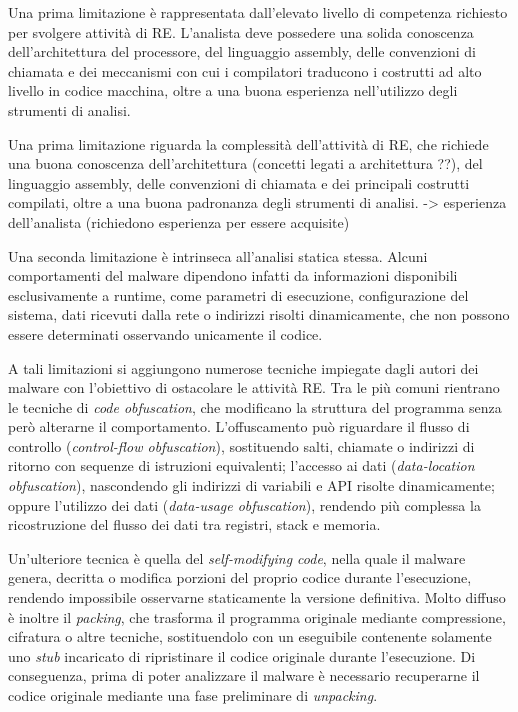 Una prima limitazione è rappresentata dall'elevato livello di competenza richiesto per svolgere attività di RE. L'analista deve possedere una solida conoscenza dell'architettura del processore, del linguaggio assembly, delle convenzioni di chiamata e dei meccanismi con cui i compilatori traducono i costrutti ad alto livello in codice macchina, oltre a una buona esperienza nell'utilizzo degli strumenti di analisi.

Una prima limitazione riguarda la complessità dell'attività di RE, che richiede una buona conoscenza dell'architettura (concetti legati a architettura ??), del linguaggio assembly, delle convenzioni di chiamata e dei principali costrutti compilati, oltre a una buona padronanza degli strumenti di analisi. -> esperienza dell'analista (richiedono esperienza per essere acquisite)

Una seconda limitazione è intrinseca all'analisi statica stessa. Alcuni comportamenti del malware dipendono infatti da informazioni disponibili esclusivamente a runtime, come parametri di esecuzione, configurazione del sistema, dati ricevuti dalla rete o indirizzi risolti dinamicamente, che non possono essere determinati osservando unicamente il codice.

A tali limitazioni si aggiungono numerose tecniche impiegate dagli autori dei malware con l'obiettivo di ostacolare le attività RE. Tra le più comuni rientrano le tecniche di \textit{code obfuscation}, che modificano la struttura del programma senza però alterarne il comportamento. L'offuscamento può riguardare il flusso di controllo (\textit{control-flow obfuscation}), sostituendo salti, chiamate o indirizzi di ritorno con sequenze di istruzioni equivalenti; l'accesso ai dati (\textit{data-location obfuscation}), nascondendo gli indirizzi di variabili e API risolte dinamicamente; oppure l'utilizzo dei dati (\textit{data-usage obfuscation}), rendendo più complessa la ricostruzione del flusso dei dati tra  registri, stack e memoria. %

Un'ulteriore tecnica è quella del \textit{self-modifying code}, nella quale il malware genera, decritta o modifica porzioni del proprio codice durante l'esecuzione, rendendo impossibile osservarne staticamente la versione definitiva. Molto diffuso è inoltre il \textit{packing}, che trasforma il programma originale mediante compressione, cifratura o altre tecniche, sostituendolo con un eseguibile contenente solamente uno \textit{stub} incaricato di ripristinare il codice originale durante l'esecuzione. Di conseguenza, prima di poter analizzare il malware è necessario recuperarne il codice originale mediante una fase preliminare di \textit{unpacking}.

